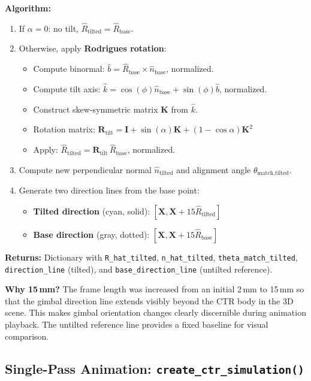 \documentclass[11pt,a4paper]{article}
\newcommand{\funcname}[1]{\texttt{\textcolor{codepurple}{#1}}}
\begin{document}
\textbf{Algorithm:}
\begin{enumerate}[nosep]
    \item If $\alpha = 0$: no tilt, $\hat{R}_\text{tilted} = \hat{R}_\text{base}$.
    \item Otherwise, apply \textbf{Rodrigues rotation}:
    \begin{itemize}[nosep]
        \item Compute binormal: $\hat{b} = \hat{R}_\text{base} \times \hat{n}_\text{base}$, normalized.
        \item Compute tilt axis: $\hat{k} = \cos(\phi) \hat{n}_\text{base} + \sin(\phi) \hat{b}$, normalized.
        \item Construct skew-symmetric matrix $\mathbf{K}$ from $\hat{k}$.
        \item Rotation matrix: $\mathbf{R}_\text{tilt} = \mathbf{I} + \sin(\alpha) \mathbf{K} + (1 - \cos\alpha) \mathbf{K}^2$
        \item Apply: $\hat{R}_\text{tilted} = \mathbf{R}_\text{tilt} \, \hat{R}_\text{base}$, normalized.
    \end{itemize}
    \item Compute new perpendicular normal $\hat{n}_\text{tilted}$ and alignment angle $\theta_{\text{match,tilted}}$.
    \item Generate two direction lines from the base point:
    \begin{itemize}[nosep]
        \item \textbf{Tilted direction} (cyan, solid): $[\mathbf{X}, \mathbf{X} + 15 \hat{R}_\text{tilted}]$
        \item \textbf{Base direction} (gray, dotted): $[\mathbf{X}, \mathbf{X} + 15 \hat{R}_\text{base}]$
    \end{itemize}
\end{enumerate}

\textbf{Returns:} Dictionary with \texttt{R\_hat\_tilted}, \texttt{n\_hat\_tilted}, \texttt{theta\_match\_tilted}, \texttt{direction\_line} (tilted), and \texttt{base\_direction\_line} (untilted reference).

\textbf{Why 15\,mm?} The frame length was increased from an initial 2\,mm to 15\,mm so that the gimbal direction line extends visibly beyond the CTR body in the 3D scene. This makes gimbal orientation changes clearly discernible during animation playback. The untilted reference line provides a fixed baseline for visual comparison.

\subsection{Single-Pass Animation: \funcname{create\_ctr\_simulation()}}
\end{document}
